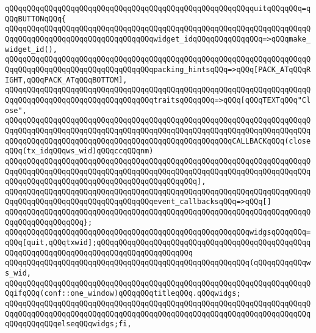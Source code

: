\verb|qQQqqQQqqQQqqQQqqQQqqQQqqQQqqQQqqQQqqQQqqQQqqQQqqQQqqQQqquitqQQqqQQq=qQQqBUTTONqQQq{|\newline
\verb|qQQqqQQqqQQqqQQqqQQqqQQqqQQqqQQqqQQqqQQqqQQqqQQqqQQqqQQqqQQqqQQqqQQqqQQqqQQqqQQqqQQqqQQqqQQqqQQqqQQqqQQqwidget_idqQQqqQQqqQQqqQQq=>qQQqmake_widget_id(),|\newline
\verb|qQQqqQQqqQQqqQQqqQQqqQQqqQQqqQQqqQQqqQQqqQQqqQQqqQQqqQQqqQQqqQQqqQQqqQQqqQQqqQQqqQQqqQQqqQQqqQQqqQQqqQQqpacking_hintsqQQq=>qQQq[PACK_ATqQQqRIGHT,qQQqPACK_ATqQQqBOTTOM],|\newline
\verb|qQQqqQQqqQQqqQQqqQQqqQQqqQQqqQQqqQQqqQQqqQQqqQQqqQQqqQQqqQQqqQQqqQQqqQQqqQQqqQQqqQQqqQQqqQQqqQQqqQQqqQQqtraitsqQQqqQQq=>qQQq[qQQqTEXTqQQq"Close",|\newline
\verb|qQQqqQQqqQQqqQQqqQQqqQQqqQQqqQQqqQQqqQQqqQQqqQQqqQQqqQQqqQQqqQQqqQQqqQQqqQQqqQQqqQQqqQQqqQQqqQQqqQQqqQQqqQQqqQQqqQQqqQQqqQQqqQQqqQQqqQQqqQQqqQQqqQQqqQQqqQQqqQQqqQQqqQQqqQQqqQQqqQQqqQQqqQQqqQQqCALLBACKqQQq(closeqQQq(tx_idqQQqws_wid)qQQqccqQQqnm)|\newline
\verb|qQQqqQQqqQQqqQQqqQQqqQQqqQQqqQQqqQQqqQQqqQQqqQQqqQQqqQQqqQQqqQQqqQQqqQQqqQQqqQQqqQQqqQQqqQQqqQQqqQQqqQQqqQQqqQQqqQQqqQQqqQQqqQQqqQQqqQQqqQQqqQQqqQQqqQQqqQQqqQQqqQQqqQQqqQQqqQQqqQQqqQQq],|\newline
\verb|qQQqqQQqqQQqqQQqqQQqqQQqqQQqqQQqqQQqqQQqqQQqqQQqqQQqqQQqqQQqqQQqqQQqqQQqqQQqqQQqqQQqqQQqqQQqqQQqqQQqqQQqevent_callbacksqQQq=>qQQq[]|\newline
\verb|qQQqqQQqqQQqqQQqqQQqqQQqqQQqqQQqqQQqqQQqqQQqqQQqqQQqqQQqqQQqqQQqqQQqqQQqqQQqqQQqqQQqqQQq};|\newline
\newline
\verb|qQQqqQQqqQQqqQQqqQQqqQQqqQQqqQQqqQQqqQQqqQQqqQQqqQQqqQQqwidgsqQQqqQQq=qQQq[quit,qQQqtxwid];qQQqqQQqqQQqqQQqqQQqqQQqqQQqqQQqqQQqqQQqqQQqqQQqqQQqqQQqqQQqqQQqqQQqqQQqqQQqqQQqqQQqqQQqqQQq|\newline
\newline
\newline
\verb|qQQqqQQqqQQqqQQqqQQqqQQqqQQqqQQqqQQqqQQqqQQqqQQqqQQqqQQq(qQQqqQQqqQQqws_wid,|\newline
\newline
\verb|qQQqqQQqqQQqqQQqqQQqqQQqqQQqqQQqqQQqqQQqqQQqqQQqqQQqqQQqqQQqqQQqqQQqqQQqifqQQq(conf::one_window)qQQqqQQqtitleqQQq.qQQqwidgs;|\newline
\verb|qQQqqQQqqQQqqQQqqQQqqQQqqQQqqQQqqQQqqQQqqQQqqQQqqQQqqQQqqQQqqQQqqQQqqQQqqQQqqQQqqQQqqQQqqQQqqQQqqQQqqQQqqQQqqQQqqQQqqQQqqQQqqQQqqQQqqQQqqQQqqQQqqQQqqQQqelseqQQqwidgs;fi,|\newline
